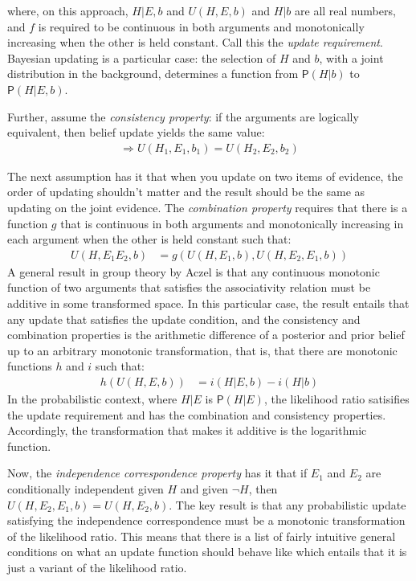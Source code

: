 \documentclass[
  10pt,
  dvipsnames,enabledeprecatedfontcommands]{scrartcl}
\newcommand{\n}{\neg}
\newcommand{\pr}[1]{\mathsf{P}(#1)}
\begin{document}
\noindent where, on this approach, \(H \vert E, b\) and \(U(H,E,b)\) and
\(H \vert b\) are all real numbers, and \(f\) is required to be
continuous in both arguments and monotonically increasing when the other
is held constant. Call this the \textit{update requirement}. Bayesian
updating is a particular case: the selection of \(H\) and \(b\), with a
joint distribution in the background, determines a function from
\(\pr{H \vert b}\) to \(\pr{H \vert E, b}\).

Further, assume the \textit{consistency property}: if the arguments are
logically equivalent, then belief update yields the same value:
\begin{align*}
[H_1 \Leftrightarrow H_2, E_1 \Leftrightarrow E_2] \Rightarrow U(H_1, E_1, b_1) = U(H_2, E_2, b_2)
\end{align*}

The next assumption has it that when you update on two items of
evidence, the order of updating shouldn't matter and the result should
be the same as updating on the joint evidence. The
\textit{combination property} requires that there is a function \(g\)
that is continuous in both arguments and monotonically increasing in
each argument when the other is held constant such that: \begin{align*}
U(H, E_1E_2,b) & =  g(U(H,E_1, b), U(H, E_2, E_1, b))
\end{align*} A general result in group theory by Aczel is that any
continuous monotonic function of two arguments that satisfies the
associativity relation must be additive in some transformed space. In
this particular case, the result entails that any update that satisfies
the update condition, and the consistency and combination properties is
the arithmetic difference of a posterior and prior belief up to an
arbitrary monotonic transformation, that is, that there are monotonic
functions \(h\) and \(i\) such that: \begin{align*}
h(U(H,E,b)) & = i(H\vert E, b) - i(H\vert b)
\end{align*} In the probabilistic context, where \(H\vert E\) is
\(\pr{H\vert E}\), the likelihood ratio satisifies the update
requirement and has the combination and consistency properties.
Accordingly, the transformation that makes it additive is the
logarithmic function.

Now, the \emph{independence correspondence property} has it that if
\(E_1\) and \(E_2\) are conditionally independent given \(H\) and given
\(\n H\), then \(U(H, E_2, E_1, b) = U(H, E_2, b)\). The key result is
that any probabilistic update satisfying the independence correspondence
must be a monotonic transformation of the likelihood ratio. This means
that there is a list of fairly intuitive general conditions on what an
update function should behave like which entails that it is just a
variant of the likelihood ratio.
\end{document}
